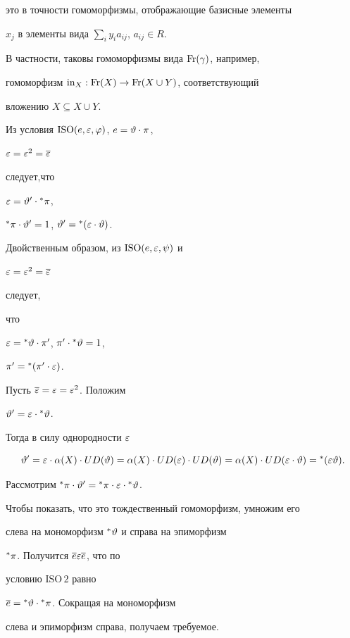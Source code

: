это в точности гомоморфизмы, отображающие базисные элементы


$x_j$ в элементы вида $\sum\limits_i y_ia_{ij}$, $a_{ij}\in R$.


В частности, таковы гомоморфизмы вида $ \operatorname{Fr}(\gamma) $, например,


гомоморфизм $\operatorname{in}_X:\operatorname{Fr}(X)\to \operatorname{Fr}(X\cup Y)$, соответствующий


вложению $X\subseteq X\cup Y$.





\begin{lem}


Из условия ${\mathrm{ISO}}(e,\varepsilon,\varphi)$, $e=\vartheta\cdot\pi$,


$\varepsilon=\varepsilon^2=\overline{\varepsilon}$


следует,что


$\varepsilon=\vartheta'\cdot{}^{\ast}{\pi}$,


${}^{\ast}{\pi}\cdot\vartheta'=1$, $\vartheta'={}^{\ast}{(\varepsilon\cdot\vartheta)}$.


Двойственным образом, из ${\mathrm{ISO}}(e,\varepsilon,\psi) $ и


$\varepsilon=\varepsilon^2=\overline{\varepsilon}$


следует,


что


$\varepsilon={}^{\ast}{\vartheta}\cdot\pi'$, $\pi'\cdot{}^{\ast}{\vartheta}=1$,


$\pi'={}^{\ast}{(\pi'\cdot\varepsilon)}$.


\end{lem}





\begin{pf} Пусть $\overline{\varepsilon}=\varepsilon=\varepsilon^2$. Положим


$\vartheta'=\varepsilon\cdot{}^{\ast}{\vartheta}$.


Тогда в силу однородности $\varepsilon$


$$


\te'=\ep\cdot\alpha(X)\cdot UD(\te)=


\alpha(X)\cdot UD(\ep)\cdot UD(\te)=


\alpha(X)\cdot UD(\ep\cdot\te)= \a{(\ep\te)}.


$$


Рассмотрим ${}^{\ast}{\pi}\cdot \vartheta'={}^{\ast}{\pi}\cdot\varepsilon\cdot{}^{\ast}{\vartheta}$.


Чтобы показать, что это тождественный гомоморфизм, умножим его


слева на мономорфизм ${}^{\ast}{\vartheta}$ и справа на эпиморфизм


${}^{\ast}{\pi}$. Получится $\overline{e}\varepsilon\overline{e}$, что по


условию ${\mathrm{ISO\,2}}$ равно


$\overline{e}={}^{\ast}{\vartheta}\cdot{}^{\ast}{\pi}$. Сокращая на мономорфизм


слева и эпиморфизм справа, получаем требуемое.


\end{pf}





